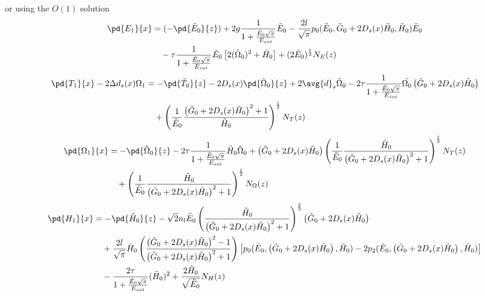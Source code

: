 or using the $O(1)$ solution
\begin{equation}
\begin{split}
\pd{E_1}{x} &= (-\pd{\tilde{E}_0}{z}) + 2g \frac{1}{1+\frac{\tilde{E}_0\sqrt{\pi}}{E_{sat}}} \tilde{E}_0 - \frac{2l}{\sqrt{\pi}} p_0(\tilde{E}_0,\tilde{G}_0+ 2 D_s(x) \tilde{H}_0,\tilde{H}_0) \tilde{E}_0 \\
&\quad- \tau \frac{1}{1+\frac{\tilde{E}_0\sqrt{\pi}}{E_{sat}}} \tilde{E}_0 \left[2 (\tilde{\Omega}_0)^2 + \tilde{H}_0\right] + (2\tilde{E}_0)^{\frac{1}{2}}N_E(z) \\
\end{split}
\end{equation}
\begin{equation}
\begin{split}
\pd{T_1}{x}-2\Delta d_s(x) \Omega_1 &= -\pd{\tilde{T}_0}{z} - 2 D_s(x) \pd{\tilde{\Omega}_0}{z} + 2\avg{d}_s \tilde{\Omega}_0 - 2 \tau \frac{1}{1+\frac{\tilde{E}_0\sqrt{\pi}}{E_{sat}}} \tilde{\Omega_0} \left(\tilde{G}_0+ 2 D_s(x) \tilde{H}_0\right) \\
&\quad+ \left(\frac{1}{\tilde{E}_0}\frac{\left(\tilde{G}_0 + 2 D_s(x) \tilde{H}_0\right)^2+1}{\tilde{H}_0}\right)^{\frac{1}{2}} N_T(z)\\
\end{split}
\end{equation}
\begin{equation}
\begin{split}
\pd{\Omega_1}{x} &= -\pd{\tilde{\Omega}_0}{z} - 2 \tau \frac{1}{1+\frac{\tilde{E}_0\sqrt{\pi}}{E_{sat}}} \tilde{H}_0 \tilde{\Omega}_0 + \left(\tilde{G}_0+ 2 D_s(x) \tilde{H}_0\right)\left(\frac{1}{\tilde{E}_0}\frac{\tilde{H}_0}{\left(\tilde{G}_0+ 2 D_s(x) \tilde{H}_0\right)^2+1}\right)^{\frac{1}{2}} N_T(z) \\
&\quad+ \left(\frac{1}{\tilde{E}_0}\frac{\tilde{H}_0}{\left(\tilde{G}_0+ 2 D_s(x) \tilde{H}_0\right)^2+1}\right)^{\frac{1}{2}}N_\Omega(z)\\
\end{split}
\end{equation}
\begin{equation}
\begin{split}
\pd{H_1}{x} &= -\pd{\tilde{H}_0}{z} - \sqrt{2}n_{l}\tilde{E}_0 \left(\frac{\tilde{H}_0}{\left(\tilde{G}_0+ 2 D_s(x) \tilde{H}_0\right)^2+1}\right)^{\frac{2}{3}} \left(\tilde{G}_0+ 2 D_s(x) \tilde{H}_0\right) \\
&\quad+ \frac{2l}{\sqrt{\pi}}\tilde{H}_0 \left(\frac{\left(\tilde{G}_0+ 2 D_s(x) \tilde{H}_0\right)^2-1}{\left(\tilde{G}_0+ 2 D_s(x) \tilde{H}_0\right)^2+1}\right) \left[p_0(\tilde{E}_0,\left(\tilde{G}_0 + 2 D_s(x) \tilde{H}_0\right),\tilde{H}_0) - 2p_2(\tilde{E}_0,\left(\tilde{G}_0+ 2 D_s(x) \tilde{H}_0\right),\tilde{H}_0)\right] \\
&\quad - \frac{2\tau}{1+\frac{\tilde{E}_0 \sqrt{\pi}}{E_{sat}}} (\tilde{H}_0)^2  + \frac{2\tilde{H}_0}{\sqrt{\tilde{E}_0}} N_H(z)\\
\end{split}
\end{equation}
